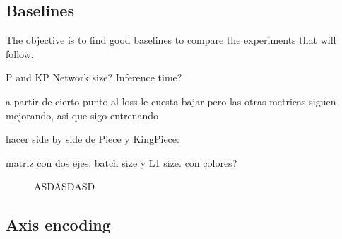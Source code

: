 \subsection{Baselines}

The objective is to find good baselines to compare the experiments that will follow.

P and KP
Network size?
Inference time?

a partir de cierto punto al loss le cuesta bajar pero las otras metricas siguen mejorando, asi que sigo entrenando

hacer side by side de Piece y KingPiece:

matriz con dos ejes: batch size y L1 size. con colores?

\begin{figure}[H]
\centering
{}
\caption{ASDASDASD}
\label{fig:asdasdasd}
\end{figure}


\subsection{Axis encoding} %

\newcommand{\axisarrows}[1]{\parbox{0.7cm}{\texttt{[image: ../assets/arrows/\#1.pdf]}}}
\newcommand{\rolecolor}{$\times$ $\featureset{Role}_{P} \times \featureset{Color}_{P}$}

